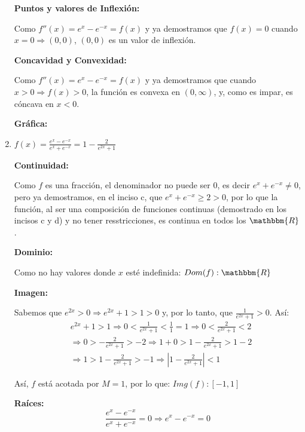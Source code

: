 \documentclass[12pt]{article}
\begin{document}
\begin{enumerate}[\hspace{9px} a)]
        \textbf{Puntos y valores de Inflexi\'on: }\medskip

            Como \(f''(x)=e^x-e^{-x}=f(x)\) y ya demostramos que \(f(x)=0\) cuando \(x=0 \Rightarrow (0,0)\), \((0,0)\) es un valor de inflexi\'on.

        \textbf{Concavidad y Convexidad: }\medskip

            Como \(f''(x)=e^x-e^{-x}=f(x)\) y ya demostramos que cuando \(x>0 \Rightarrow f(x)>0\), la funci\'on es convexa en \((0,\infty)\), y, como es impar, es c\'oncava en \(x<0\).\medskip

        \textbf{Gr\'afica: }

    \item \(f(x)=\displaystyle\frac{e^x-e^{-x}}{e^x+e^{-x}}=1-\frac{2}{e^{2x}+1}\)\medskip
    
        \textbf{Continuidad: }\medskip

            Como \(f\) es una fracci\'on, el denominador no puede ser 0, es decir \(e^x+e^{-x}\neq0\), pero ya demostramos, en el inciso c, que \(e^x+e^{-x}\geq2>0\), por lo que la funci\'on, al ser una composici\'on de funciones continuas (demostrado en los incisos c y d) y no tener resstricciones, es continua en todos los \(\mathbbm{R}\).\medskip

        \textbf{Dominio: }\medskip

            Como no hay valores donde $x$ est\'e indefinida: \(Dom(f):\mathbbm{R}\)\medskip

        \textbf{Imagen: }\medskip

            Sabemos que \(e^{2x}>0 \Rightarrow e^{2x}+1>1>0\) y, por lo tanto, que \(\displaystyle\frac{1}{e^{2x}+1}>0\). As\'i:
            \begin{align*}
                &e^{2x}+1>1 \Longrightarrow 0<\frac{1}{e^{2x}+1}<\frac{1}{1}=1 \Longrightarrow  0<\frac{2}{e^{2x}+1}<2 \\
                &\Longrightarrow  0>-\frac{2}{e^{2x}+1}>-2 \Longrightarrow  1+0>1-\frac{2}{e^{2x}+1}>1-2 \\ 
                &\Longrightarrow  1>1-\frac{2}{e^{2x}+1}>-1 \Longrightarrow \left|1-\frac{2}{e^{2x}+1}\right|<1
            \end{align*}

            As\'i, $f$  est\'a acotada por $M=1$, por lo que: \(Img(f): [-1,1]\)\medskip

        \textbf{Ra\'ices: }
            \begin{equation*}
                \frac{e^x-e^{-x}}{e^x+e^{-x}}=0 \Longrightarrow e^x-e^{-x}=0
            \end{equation*}


\end{enumerate}
\end{document}
